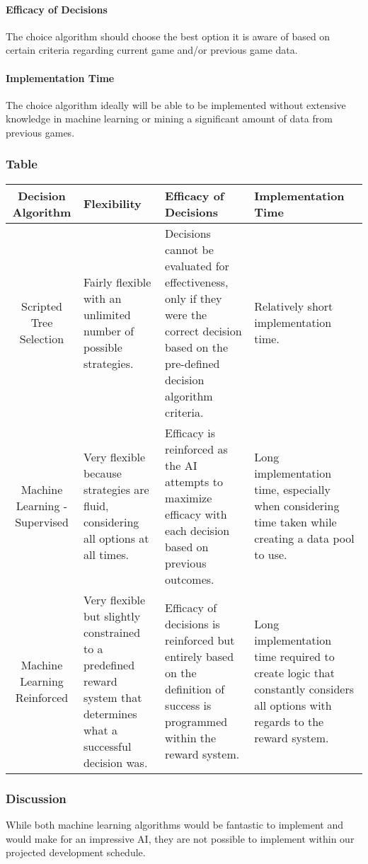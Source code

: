 \documentclass[10pt,letterpaper,onecolumn,draftclsnofoot]{IEEEtran}
\begin{document}
\paragraph{Efficacy of Decisions}
The choice algorithm should choose the best option it is aware of based on certain criteria regarding current game and/or previous game data.
\paragraph{Implementation Time}
The choice algorithm ideally will be able to be implemented without extensive knowledge in machine learning or mining a significant amount of data from previous games.
\subsubsection{Table}
\begin{center}
	\begin{tabular}{ ||C|M|M|M|| } 
		\hline
		Decision Algorithm & Flexibility & Efficacy of Decisions & Implementation Time \\
		\hline
		Scripted Tree Selection & Fairly flexible with an unlimited number of possible strategies. & Decisions cannot be evaluated for effectiveness, only if they were the correct decision based on the pre-defined decision algorithm criteria. & Relatively short implementation time. \\ 
		\hline
		Machine Learning - Supervised & Very flexible because strategies are fluid, considering all options at all times. & Efficacy is reinforced as the AI attempts to maximize efficacy with each decision based on previous outcomes. & Long implementation time, especially when considering time taken while creating a data pool to use. \\ 
		\hline
		 Machine Learning Reinforced & Very flexible but slightly constrained to a predefined reward system that determines what a successful decision was. & Efficacy of decisions is reinforced but entirely based on the definition of success is programmed within the reward system. & Long implementation time required to create logic that constantly considers all options with regards to the reward system. \\ 
		\hline
	\end{tabular}
\end{center}
\subsubsection{Discussion}
While both machine learning algorithms would be fantastic to implement and would make for an impressive AI, they are not possible to implement within our projected development schedule. 
\end{document}
